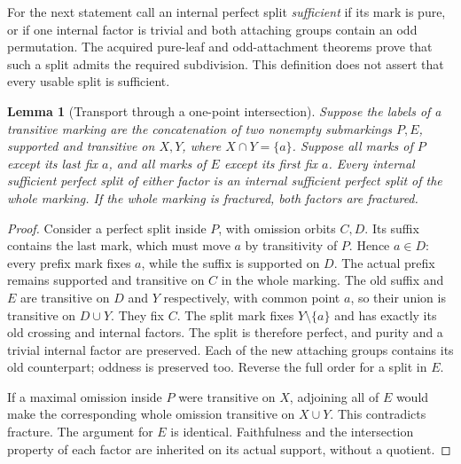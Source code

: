 \documentclass[11pt,a4paper]{article}
\newtheorem{lemma}{Lemma}
\begin{document}
For the next statement call an internal perfect split \emph{sufficient}
if its mark is pure, or if one internal factor is trivial and both
attaching groups contain an odd permutation. The acquired pure-leaf
and odd-attachment theorems prove that such a split admits the required
subdivision. This definition does not assert that every usable split
is sufficient.

\begin{lemma}[Transport through a one-point intersection]\label{transport}
Suppose the labels of a transitive marking are the concatenation of
two nonempty submarkings $P,E$, supported and transitive on $X,Y$,
where $X\cap Y=\{a\}$. Suppose all marks of $P$ except its last
fix $a$, and all marks of $E$ except its first fix $a$.
Every internal sufficient perfect split of either factor is an
internal sufficient perfect split of the whole marking. If the
whole marking is fractured, both factors are fractured.
\end{lemma}
\begin{proof}
Consider a perfect split inside $P$, with omission orbits $C,D$.
Its suffix contains the last mark, which must move $a$ by
transitivity of $P$. Hence $a\in D$: every prefix mark fixes $a$,
while the suffix is supported on $D$. The actual prefix remains
supported and transitive on $C$ in the whole marking. The old
suffix and $E$ are transitive on $D$ and $Y$ respectively, with
common point $a$, so their union is transitive on $D\cup Y$.
They fix $C$. The split mark fixes $Y\setminus\{a\}$ and has
exactly its old crossing and internal factors. The split is therefore
perfect, and purity and a trivial internal factor are preserved.
Each of the new attaching groups contains its old counterpart;
oddness is preserved too. Reverse the full order for a split in $E$.

If a maximal omission inside $P$ were transitive on $X$, adjoining
all of $E$ would make the corresponding whole omission transitive
on $X\cup Y$. This contradicts fracture. The argument for $E$
is identical. Faithfulness and the intersection property of each
factor are inherited on its actual support, without a quotient.
\end{proof}
\end{document}
